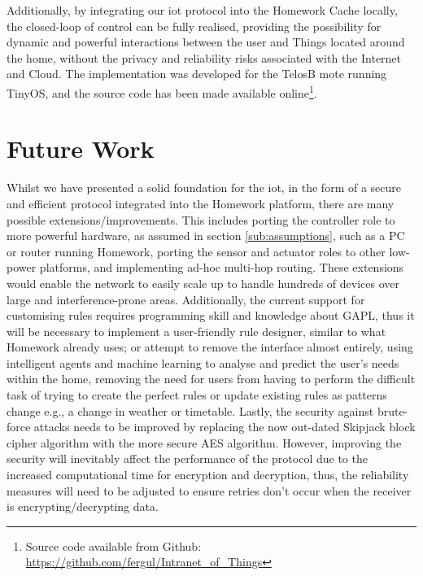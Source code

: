 \documentclass{mpaper}
\begin{document}
Additionally, by integrating our iot protocol into the Homework Cache locally, the closed-loop of control can be fully realised, providing the possibility for dynamic and powerful interactions between the user and Things located around the home, without the privacy and reliability risks associated with the Internet and Cloud. The implementation was developed for the TelosB mote running TinyOS, and the source code has been made available online\footnote{Source code available from Github: \url{https://github.com/fergul/Intranet_of_Things}}.

\section{Future Work} %
\label{sec:future_work}
Whilst we have presented a solid foundation for the iot, in the form of a secure and efficient protocol integrated into the Homework platform, there are many possible extensions/improvements. This includes porting the controller role to more powerful hardware, as assumed in section \ref{sub:assumptions}, such as a PC or router running Homework, porting the sensor and actuator roles to other low-power platforms, and implementing ad-hoc multi-hop routing. These extensions would enable the network to easily scale up to handle hundreds of devices over large and interference-prone areas. Additionally, the current support for customising rules requires programming skill and knowledge about GAPL, thus it will be necessary to implement a user-friendly rule designer, similar to what Homework already uses\cite{HomeworkInterface}; or attempt to remove the interface almost entirely, using intelligent agents and machine learning to analyse and predict the user's needs within the home\cite{SmartHomeFusion,mavhome}, removing the need for users from having to perform the difficult task of trying to create the perfect rules or update existing rules as patterns change e.g., a change in weather or timetable. Lastly, the security against brute-force attacks needs to be improved by replacing the now out-dated Skipjack block cipher algorithm with the more secure AES algorithm\cite{NIST}. However, improving the security will inevitably affect the performance of the protocol due to the increased computational time for encryption and decryption, thus, the reliability measures will need to be adjusted to ensure retries don't occur when the receiver is encrypting/decrypting data.


\end{document}
